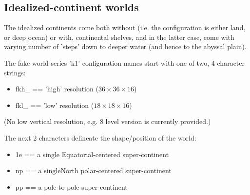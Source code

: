%
\subsection{Idealized-continent worlds}

The idealized continents come both without (i.e. the configuration is either land, or deep ocean) or with, continental shelves, and in the latter case, come with varying number of 'steps' down to deeper water (and hence to the abyssal plain).

The fake world series 'k1' configuration names start with one of two, 4 character strings:
\begin{itemize}[noitemsep]
\vspace{1mm}
\item \textsf{\footnotesize fkh\_} == 'high' resolution (\(36\times36\times16\))
\item \textsf{\footnotesize fkl\_} == 'low' resolution (\(18\times18\times16\))
\end{itemize}
\vspace{1mm}
\noindent (No low vertical resolution, e.g. \(8\) level version is currently provided.)
\vspace{1mm}

The next 2 characters delineate the shape/position of the world:
\begin{itemize}[noitemsep]
\vspace{1mm}
\item \textsf{\footnotesize 1e} == a single Equatorial-centered super-continent
\item \textsf{\footnotesize np} == a singleNorth polar-centered super-continent
\item \textsf{\footnotesize pp} == a pole-to-pole super-continent
\end{itemize}
\vspace{2mm}

